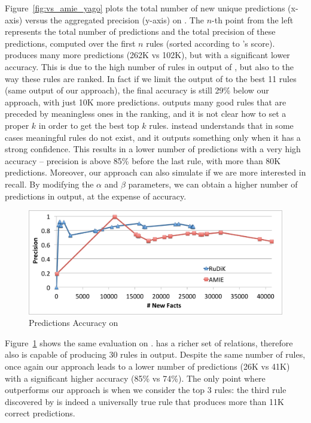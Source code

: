 Figure~\ref{fig:vs_amie_yago} plots the total number of new unique predictions (x-axis) versus the aggregated precision (y-axis) on \yago. The $n$-th point from the left represents the total number of predictions and the total precision of these predictions, computed over the first $n$ rules (sorted according to \amie's score). \amie produces many more predictions (262K vs 102K), but with a significant lower accuracy. This is due to the high number of rules in output of \amie, but also to the way these rules are ranked. In fact if we limit the output of \amie to the best 11 rules (same output of our approach), the final accuracy is still 29\% below our approach, with just 10K more predictions. \amie outputs many good rules that are preceded by meaningless ones in the ranking, and it is not clear how to set a proper $k$ in order to get the best top $k$ rules. \krd instead understands that in some cases meaningful rules do not exist, and it outputs something only when it has a strong confidence. This results in a lower number of predictions with a very high accuracy -- precision is above 85\% before the last rule, with more than 80K predictions. Moreover, our approach can also simulate \amie if we are more interested in recall. By modifying the $\alpha$ and $\beta$ parameters, we can obtain a higher number of predictions in output, at the expense of accuracy. 

\begin{figure}[t]
	\centering
	\includegraphics[width=.7\columnwidth]{include/figure/vsAmieDBPedia.pdf}
	\caption{Predictions Accuracy on \dbpedia}
	\label{fig:vs_amie_dbpedia}
\end{figure}

Figure~\ref{fig:vs_amie_dbpedia} shows the same evaluation on \dbpedia. \dbpedia has a richer set of relations, therefore also \krd is capable of producing 30 rules in output. Despite the same number of rules, once again our approach leads to a lower number of predictions (26K vs 41K) with a significant higher accuracy (85\% vs 74\%). The only point where \amie outperforms our approach is when we consider the top $3$ rules: the third rule discovered by \amie is indeed a universally true rule that produces more than 11K correct predictions.

